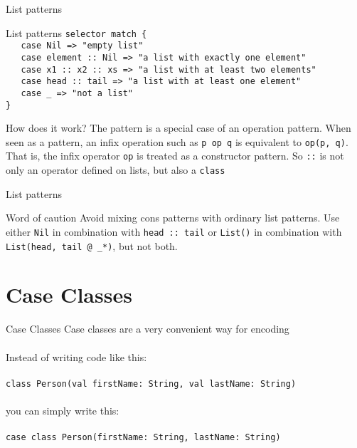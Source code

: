 \begin{frame}[fragile]{List patterns}
\begin{exampleblock}{List patterns}
\lstinline!selector match {!\\
\lstinline!   case Nil => "empty list"!\\
\lstinline!   case element :: Nil => "a list with exactly one element"!\\
\lstinline!   case x1 :: x2 :: xs => "a list with at least two elements"!\\
\lstinline!   case head :: tail => "a list with at least one element"!\\
\lstinline!   case _ => "not a list"!\\
\lstinline!}!
\end{exampleblock}
\begin{block}{How does it work?}
The  pattern is a special case of an  operation
pattern. When seen as a pattern, an infix operation such as \lstinline!p op q!
is equivalent to \lstinline!op(p, q)!. That is, the infix operator
\lstinline!op! is treated as a constructor pattern. So \lstinline!::! is not
only an operator defined on lists, but also a \lstinline!class!
\end{block}
\end{frame}

\begin{frame}[fragile]{List patterns}
\begin{alertblock}{Word of caution}
Avoid mixing cons patterns with ordinary list patterns. Use either
\lstinline!Nil! in combination with \lstinline!head :: tail! or
\lstinline!List()! in combination with \lstinline!List(head, tail @ _*)!, but
not both.
\end{alertblock}
\end{frame}

\section{Case Classes}
\begin{frame}[fragile]{Case Classes}
Case classes are a very convenient way for encoding \\
\lstinline!!\\
Instead of writing code like this:\\
\lstinline!!\\
\lstinline!class Person(val firstName: String, val lastName: String)!\\
\lstinline!!\\
you can simply write this:\\
\lstinline!!\\
\lstinline!case class Person(firstName: String, lastName: String)!
\end{frame}

